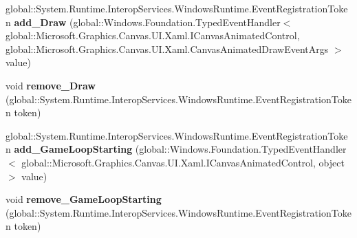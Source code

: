 \begin{DoxyCompactItemize}
\item 
\mbox{\label{interface_microsoft_1_1_graphics_1_1_canvas_1_1_u_i_1_1_xaml_1_1_i_canvas_animated_control_a12cf4dde742dabd53cdca14d77e049f4}} 
global\+::\+System.\+Runtime.\+Interop\+Services.\+Windows\+Runtime.\+Event\+Registration\+Token {\bfseries add\+\_\+\+Draw} (global\+::\+Windows.\+Foundation.\+Typed\+Event\+Handler$<$ global\+::\+Microsoft.\+Graphics.\+Canvas.\+U\+I.\+Xaml.\+I\+Canvas\+Animated\+Control, global\+::\+Microsoft.\+Graphics.\+Canvas.\+U\+I.\+Xaml.\+Canvas\+Animated\+Draw\+Event\+Args $>$ value)
\item 
\mbox{\label{interface_microsoft_1_1_graphics_1_1_canvas_1_1_u_i_1_1_xaml_1_1_i_canvas_animated_control_a92b78e42e9c4487aa3aceec75cb19108}} 
void {\bfseries remove\+\_\+\+Draw} (global\+::\+System.\+Runtime.\+Interop\+Services.\+Windows\+Runtime.\+Event\+Registration\+Token token)
\item 
\mbox{\label{interface_microsoft_1_1_graphics_1_1_canvas_1_1_u_i_1_1_xaml_1_1_i_canvas_animated_control_ace3201e05768ec0cb189a06a8287c709}} 
global\+::\+System.\+Runtime.\+Interop\+Services.\+Windows\+Runtime.\+Event\+Registration\+Token {\bfseries add\+\_\+\+Game\+Loop\+Starting} (global\+::\+Windows.\+Foundation.\+Typed\+Event\+Handler$<$ global\+::\+Microsoft.\+Graphics.\+Canvas.\+U\+I.\+Xaml.\+I\+Canvas\+Animated\+Control, object $>$ value)
\item 
\mbox{\label{interface_microsoft_1_1_graphics_1_1_canvas_1_1_u_i_1_1_xaml_1_1_i_canvas_animated_control_ae7d786b9e08eabd196fd8d0dcd993a9b}} 
void {\bfseries remove\+\_\+\+Game\+Loop\+Starting} (global\+::\+System.\+Runtime.\+Interop\+Services.\+Windows\+Runtime.\+Event\+Registration\+Token token)
\item 
\mbox{\label{interface_microsoft_1_1_graphics_1_1_canvas_1_1_u_i_1_1_xaml_1_1_i_canvas_animated_control_a47c0db742873551ad530322dc7d89abe}} 

\end{DoxyCompactItemize}
